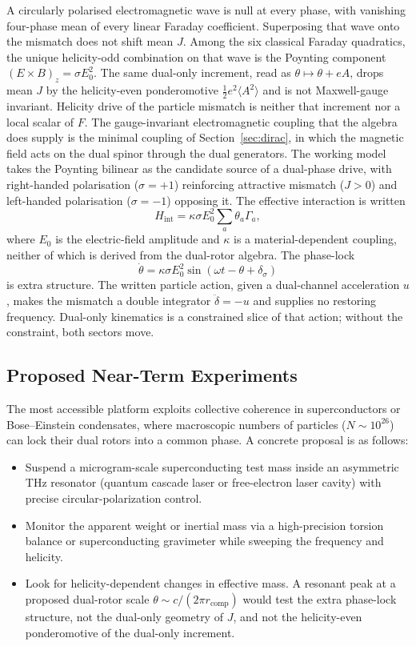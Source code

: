 \documentclass[a4paper]{article}
\begin{document}
A circularly polarised electromagnetic wave is null at every phase, with vanishing four-phase mean of every linear Faraday coefficient. Superposing that wave onto the mismatch does not shift mean $J$. Among the six classical Faraday quadratics, the unique helicity-odd combination on that wave is the Poynting component $(E\times B)_z=\sigma E_0^2$. The same dual-only increment, read as $\theta\mapsto\theta+eA$, drops mean $J$ by the helicity-even ponderomotive $\tfrac12 e^2\langle A^2\rangle$ and is not Maxwell-gauge invariant. Helicity drive of the particle mismatch is neither that increment nor a local scalar of $F$. The gauge-invariant electromagnetic coupling that the algebra does supply is the minimal coupling of Section~\ref{sec:dirac}, in which the magnetic field acts on the dual spinor through the dual generators. The working model takes the Poynting bilinear as the candidate source of a dual-phase drive, with right-handed polarisation ($\sigma=+1$) reinforcing attractive mismatch ($J>0$) and left-handed polarisation ($\sigma=-1$) opposing it. The effective interaction is written
\[
H_\text{int} = \kappa \sigma E_0^2 \sum_a \theta_a \Gamma_a,
\]
where $E_0$ is the electric-field amplitude and $\kappa$ is a material-dependent coupling, neither of which is derived from the dual-rotor algebra. The phase-lock
\[
\dot{\theta} = \kappa \sigma E_0^2 \sin(\omega t - \theta + \delta_\sigma)
\]
is extra structure. The written particle action, given a dual-channel acceleration $u$, makes the mismatch a double integrator $\ddot\delta=-u$ and supplies no restoring frequency. Dual-only kinematics is a constrained slice of that action; without the constraint, both sectors move.

\subsection{Proposed Near-Term Experiments}

The most accessible platform exploits collective coherence in superconductors or Bose--Einstein condensates, where macroscopic numbers of particles ($N \sim 10^{26}$) can lock their dual rotors into a common phase. A concrete proposal is as follows:

\begin{itemize}
\item Suspend a microgram-scale superconducting test mass inside an asymmetric THz resonator (quantum cascade laser or free-electron laser cavity) with precise circular-polarization control.
\item Monitor the apparent weight or inertial mass via a high-precision torsion balance or superconducting gravimeter while sweeping the frequency and helicity.
\item Look for helicity-dependent changes in effective mass. A resonant peak at a proposed dual-rotor scale $\theta \sim c / (2\pi r_\text{comp})$ would test the extra phase-lock structure, not the dual-only geometry of $J$, and not the helicity-even ponderomotive of the dual-only increment.
\end{itemize}
\end{document}
